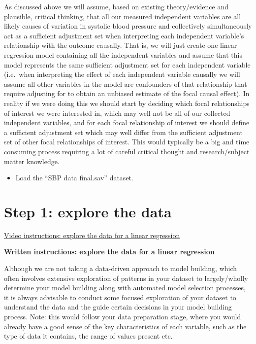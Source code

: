 \documentclass[
]{book}
\providecommand{\tightlist}{%
  \setlength{\itemsep}{0pt}\setlength{\parskip}{0pt}}
\begin{document}
As discussed above we will assume, based on existing theory/evidence and plausible, critical thinking, that all our measured independent variables are all likely causes of variation in systolic blood pressure and collectively simultaneously act as a sufficient adjustment set when interpreting each independent variable's relationship with the outcome causally. That is, we will just create one linear regression model containing all the independent variables and assume that this model represents the same sufficient adjustment set for each independent variable (i.e.~when interpreting the effect of each independent variable causally we will assume all other variables in the model are confounders of that relationship that require adjusting for to obtain an unbiased estimate of the focal causal effect). In reality if we were doing this we should start by deciding which focal relationships of interest we were interested in, which may well not be all of our collected independent variables, and for each focal relationship of interest we should define a sufficient adjustment set which may well differ from the sufficient adjustment set of other focal relationships of interest. This would typically be a big and time consuming process requiring a lot of careful critical thought and research/subject matter knowledge.

\begin{itemize}
\tightlist
\item
  Load the ``SBP data final.sav'' dataset.
\end{itemize}

\hypertarget{step-1-explore-the-data}{%
\section{Step 1: explore the data}\label{step-1-explore-the-data}}

\href{https://youtu.be/aZpnd63IM4s}{Video instructions: explore the data for a linear regression}

\textbf{Written instructions: explore the data for a linear regression}

Although we are not taking a data-driven approach to model building, which often involves extensive exploration of patterns in your dataset to largely/wholly determine your model building along with automated model selection processes, it is always advisable to conduct some focused exploration of your dataset to understand the data and the guide certain decisions in your model building process. Note: this would follow your data preparation stage, where you would already have a good sense of the key characteristics of each variable, such as the type of data it contains, the range of values present etc.
\end{document}
